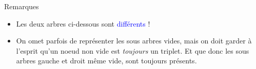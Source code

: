 \documentclass[10pt]{beamer}
\begin{document}
\begin{frame}[fragile]{\Ctitle}{\stitle}
    \begin{block}{Remarques}
        \begin{itemize}
        \item<1->{\small \textcolor{BrickRed}{\danger}} Les deux arbres ci-dessous sont \textcolor{blue}{différents} !\\
         \quad \quad \quad 
         \quad \quad \quad
        \item<2-> On omet parfois de représenter les sous arbres vides, mais on doit garder à l'esprit qu'un noeud non vide est \textit{toujours} un triplet. Et que donc les sous arbres gauche et droit même vide, sont toujours présents.
        \end{itemize}
    \end{block}
\end{frame}
\end{document}
